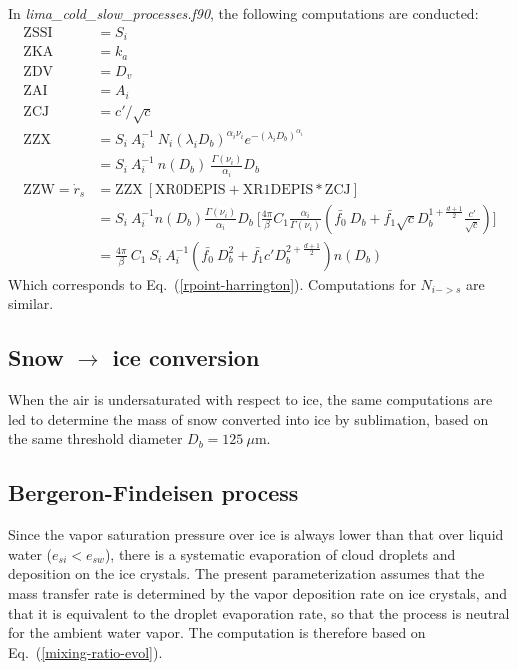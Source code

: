 In \emph{lima\_cold\_slow\_processes.f90}, the following computations are conducted:
\begin{align}
 \mathrm{ZSSI} &= S_i \\
 \mathrm{ZKA} &= k_a \\
 \mathrm{ZDV} &= D_v \\
 \mathrm{ZAI} &= A_i \\
 \mathrm{ZCJ} &= c'/\sqrt{c} \\
 \mathrm{ZZX} &= S_i ~ A_i^{-1} ~ N_i (\lambda_iD_b)^{\alpha_i\nu_i} e^{-(\lambda_iD_b)^{\alpha_i}} \\
 &= S_i ~ A_i^{-1} ~ n(D_b) ~ \frac{\Gamma(\nu_i)}{\alpha_i} D_b \\
 \mathrm{ZZW} = \dot{r}_s &= \mathrm{ZZX} ~ [\mathrm{XR0DEPIS} + \mathrm{XR1DEPIS} * \mathrm{ZCJ}]  \\
 &= S_i~A_i^{-1} n(D_b) \frac{\Gamma(\nu_i)}{\alpha_i} D_b ~ \bigg[ \frac{4\pi}{\beta} C_1 \frac{\alpha_i}{\Gamma(\nu_i)} ( \bar{f_0} ~ D_b + \bar{f_1} \sqrt{c} D_b^{1+\frac{d+1}{2}} \frac{c'}{\sqrt{c}} ) \bigg] \\
 &= \frac{4\pi}{\beta} ~ C_1 ~ S_i~A_i^{-1} ( \bar{f_0} ~ D_b^2 + \bar{f_1} c' D_b^{2+\frac{d+1}{2}}) n(D_b)
 \end{align}
Which corresponds to Eq.\ (\ref{rpoint-harrington}). Computations for $N_{i->s}$ are similar.

\subsection{Snow $\rightarrow$ ice conversion}

When the air is undersaturated with respect to ice, the same computations are led to determine the mass of snow converted into ice by sublimation, based on the same threshold diameter $D_b = 125~\mu$m.

\subsection{Bergeron-Findeisen process}

Since the vapor saturation pressure over ice is always lower than that over liquid water ($e_{si} < e_{sw}$), there is a systematic evaporation of cloud droplets and deposition on the ice crystals. The present parameterization assumes that the mass transfer rate is determined by the vapor deposition rate on ice crystals, and that it is equivalent to the droplet evaporation rate, so that the process is neutral for the ambient water vapor. The computation is therefore based on Eq.\ (\ref{mixing-ratio-evol}).

